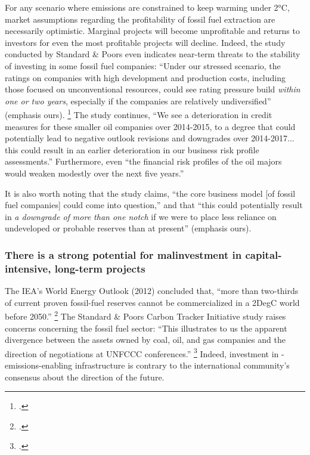 For any scenario where emissions are constrained to keep warming under 2°C, market assumptions regarding the profitability of fossil fuel extraction are necessarily optimistic. 
Marginal projects will become unprofitable and returns to investors for even the most profitable projects will decline. 
Indeed, the study conducted by Standard \& Poors even indicates near-term threats to the stability of investing in some fossil fuel companies: ``Under our stressed scenario, the ratings on companies with high development and production costs, including those focused on unconventional resources, could see rating pressure build \emph{within one or two years}, especially if the companies are relatively undiversified'' (emphasis ours). \footcite{SandPConstrained}
The study continues, ``We see a deterioration in credit measures for these smaller oil companies over 2014-2015, to a degree that could potentially lead to negative outlook revisions and downgrades over 2014-2017... this could result in an earlier deterioration in our business risk profile assessments.''
Furthermore, even ``the financial risk profiles of the oil majors would weaken modestly over the next five years.''
  
It is also worth noting that the study claims, ``the core business model [of fossil fuel companies] could come into question,'' and that ``this could potentially result in \emph{a downgrade of more than one notch} if we were to place less reliance on undeveloped or probable reserves than at present'' (emphasis ours).



	\subsubsection {There is a strong potential for malinvestment in capital-intensive, long-term projects}



The IEA's World Energy Outlook (2012) concluded that, ``more than two-thirds of current proven fossil-fuel reserves cannot be commercialized in a 2DegC world before 2050.'' \footcite{IEA2012}
The Standard \& Poors Carbon Tracker Initiative study raises concerns concerning the fossil fuel sector: ``This illustrates to us the apparent divergence between the assets owned by coal, oil, and gas companies and the direction of negotiations at UNFCCC conferences.'' \footcite{SandPConstrained}
Indeed, investment in -emissions-enabling infrastructure is contrary to the international community's consensus about the direction of the future.

